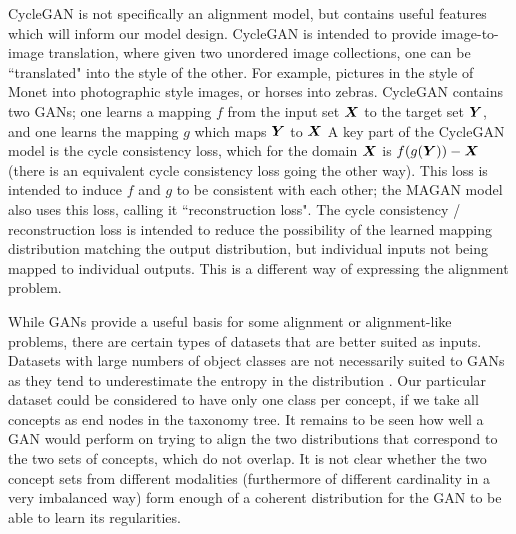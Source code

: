 CycleGAN \cite{CycleGAN} is not specifically an alignment model, but contains useful features which will inform our model design. CycleGAN is intended to provide image-to-image translation, where given two unordered image collections, one can be ``translated" into the style of the other. For example, pictures in the style of Monet into photographic style images, or horses into zebras. CycleGAN contains two GANs; one learns a mapping $f$ from the input set $\boldsymbol{X}$ to the target set $\boldsymbol{Y}$, and one learns the mapping $g$ which maps $\boldsymbol{Y}$ to $\boldsymbol{X}$ A key part of the CycleGAN model is the cycle consistency loss, which for the domain $\boldsymbol{X}$ is $f(g(\boldsymbol{Y})) - \boldsymbol{X}$ (there is an equivalent cycle consistency loss going the other way). This loss is intended to induce $f$ and $g$ to be consistent with each other; the MAGAN model also uses this loss, calling it ``reconstruction loss". The cycle consistency / reconstruction loss is intended to reduce the possibility of the learned mapping distribution matching the output distribution, but individual inputs not being mapped to individual outputs. This is a different way of expressing the alignment problem. 

While GANs provide a useful basis for some alignment or alignment-like problems, there are certain types of datasets that are better suited as inputs. Datasets with large numbers of object classes are not necessarily suited to GANs as they tend to underestimate the entropy in the distribution \cite{ImprovedTechniquesTrainingGANS} . Our particular dataset could be considered to have only one class per concept, if we take all concepts as end nodes in the taxonomy tree. It remains to be seen how well a GAN would perform on trying to align the two distributions that correspond to the two sets of concepts, which do not overlap. It is not clear whether the two concept sets from different modalities (furthermore of different cardinality in a very imbalanced way) form enough of a coherent distribution for the GAN to be able to learn its regularities. 





